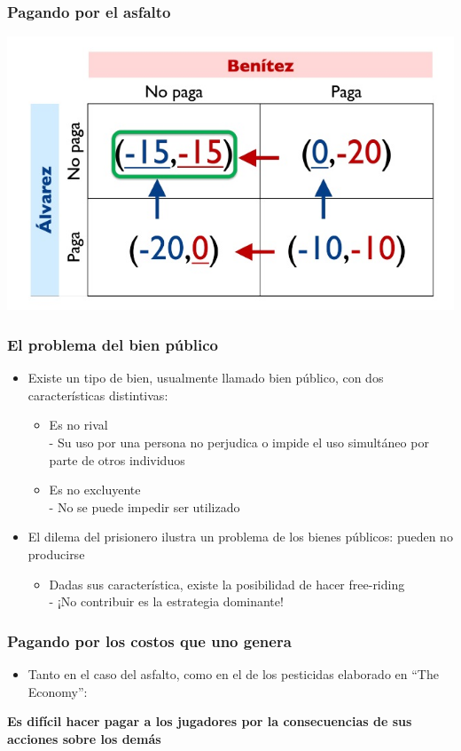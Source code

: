 \documentclass{beamer}
\begin{document}
\begin{frame}
\frametitle{ Pagando por el asfalto}
\centering
\includegraphics[scale=0.6]{Figures/Tema_03_27_abel.jpg}
\end{frame}

\begin{frame}
\frametitle{El problema del bien público}
\begin{itemize}
    \item Existe un tipo de bien, usualmente llamado bien público, con dos características distintivas:
    \begin{itemize}
        \item Es no rival \\
        - Su uso por una persona no perjudica o impide el uso simultáneo por parte de otros individuos
        \item Es no excluyente \\
        - No se puede impedir ser utilizado
    \end{itemize}
    \item El dilema del prisionero ilustra un problema de los bienes públicos: pueden no producirse
    \begin{itemize}
        \item Dadas sus característica, existe la posibilidad de hacer free-riding \\
        - ¡No contribuir es la estrategia dominante!
    \end{itemize}
\end{itemize}
\end{frame}

\begin{frame}
\frametitle{ Pagando por los costos que uno genera}
\begin{itemize}
    \item Tanto en el caso del asfalto, como en el de los pesticidas elaborado en “The Economy”: \\
\end{itemize}
\vspace{5mm}
\textbf{Es difícil hacer pagar a los jugadores por la
consecuencias de sus acciones sobre los demás}
\end{frame}
\end{document}
